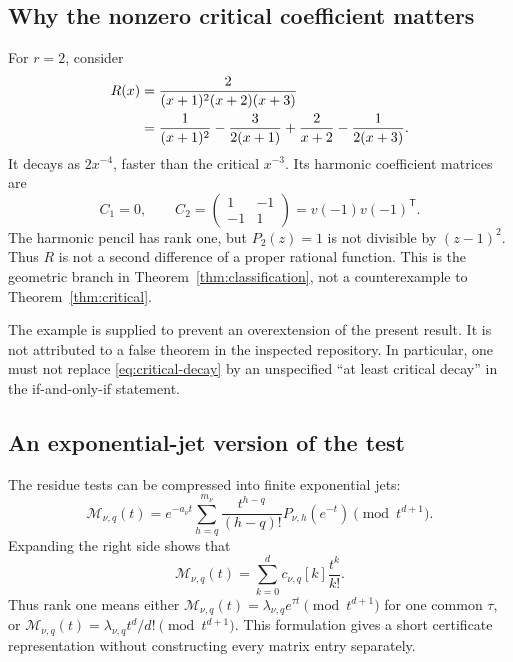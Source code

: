 \subsection{Why the nonzero critical coefficient matters}
\label{sec:counterexample}
For $r=2$, consider
\begin{align}
 R(x)&=\frac{2}{(x+1)^2(x+2)(x+3)}\label{eq:counterexample}\\
 &=\frac1{(x+1)^2}-\frac{3}{2(x+1)}
       +\frac2{x+2}-\frac1{2(x+3)}.\notag
\end{align}
It decays as $2x^{-4}$, faster than the critical $x^{-3}$.
Its harmonic coefficient matrices are
\[
 C_1=0,\qquad
 C_2=\begin{pmatrix}1&-1\\-1&1\end{pmatrix}
       =v(-1)v(-1)^{\mathsf T}.
\]
The harmonic pencil has rank one, but $P_2(z)=1$ is not divisible
by $(z-1)^2$. Thus $R$ is not a second difference of a proper
rational function. This is the geometric branch in
Theorem~\ref{thm:classification}, not a counterexample to
Theorem~\ref{thm:critical}.

The example is supplied to prevent an overextension of the present
result. It is not attributed to a false theorem in the inspected
repository. In particular, one must not replace
\eqref{eq:critical-decay} by an unspecified ``at least critical decay''
in the if-and-only-if statement.

\subsection{An exponential-jet version of the test}
The residue tests can be compressed into finite exponential jets:
\begin{equation}\label{eq:jet-pencil}
 \mathcal M_{\nu,q}(t)=e^{-a_\nu t}
     \sum_{h=q}^{m_\nu}\frac{t^{h-q}}{(h-q)!}
             P_{\nu,h}(e^{-t})\pmod{t^{d+1}}.
\end{equation}
Expanding the right side shows that
\[
 \mathcal M_{\nu,q}(t)=\sum_{k=0}^d c_{\nu,q}[k]\frac{t^k}{k!}.
\]
Thus rank one means either
$\mathcal M_{\nu,q}(t)=\lambda_{\nu,q}e^{\tau t}\pmod{t^{d+1}}$
for one common $\tau$, or
$\mathcal M_{\nu,q}(t)=\lambda_{\nu,q}t^d/d!\pmod{t^{d+1}}$.
This formulation gives a short certificate representation without
constructing every matrix entry separately.
